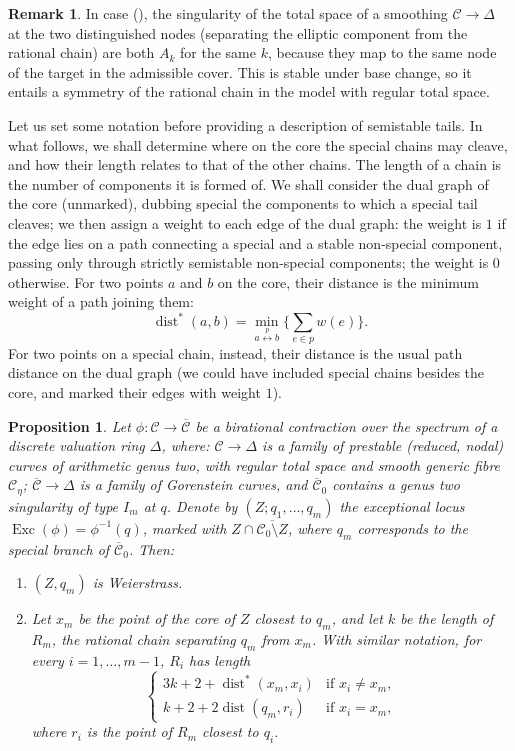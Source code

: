 \documentclass[11pt]{amsart}
\renewcommand{\to}{\rightarrow}
\newcommand{\dvr}{\Delta}
\newcommand{\dist}{\operatorname{dist}}
\newcommand{\Exc}{\operatorname{Exc}}
\theoremstyle{plain}
\newtheorem{prop}[thm]{Proposition}
\theoremstyle{definition}
\newtheorem{rem}[thm]{Remark}
\begin{document}
 \begin{rem}\label{rmk:necklace_symmetry}
  In case (\dag), the singularity of the total space of a smoothing $\mathcal C\to\dvr$ at the two distinguished nodes (separating the elliptic component from the rational chain) are both $A_k$ for the same $k$, because they map to the same node of the target in the admissible cover. This is stable under base change, so it entails a symmetry of the rational chain in the model with regular total space.
 \end{rem}

 Let us set some notation before providing a description of semistable tails. In what follows, we shall determine where on the core the special chains may cleave, and how their length relates to that of the other chains. The length of a chain is the number of components it is formed of. We shall consider the dual graph of the core (unmarked), dubbing special the components to which a special tail cleaves; we then assign a weight to each edge of the dual graph: the weight is $1$ if the edge lies on a path connecting a special and a stable non-special component, passing only through strictly semistable non-special components; the weight is $0$ otherwise. For two points $a$ and $b$ on the core, their distance is the minimum weight of a path joining them:\[\dist^*(a,b)=\min_{a\overset{p}\leftrightarrow b}\{\sum_{e\in p}w(e)\}.\]
 For two points on a special chain, instead, their distance is the usual path distance on the dual graph (we could have included special chains besides the core, and marked their edges with weight $1$).

\begin{prop}\label{prop:tailI}
 Let $\phi\colon\mathcal C\to\overline{\mathcal C}$ be a birational contraction over the spectrum of a discrete valuation ring $\dvr$, where: $\mathcal C\to \dvr$ is a family of prestable (reduced, nodal) curves of arithmetic genus two, with regular total space and smooth generic fibre $\mathcal C_{\eta}$; $\overline{\mathcal C}\to\dvr$ is a family of Gorenstein curves, and $\overline{\mathcal C}_0$ contains a genus two singularity of type $I_m$ at $q$. Denote by $(Z;q_1,\ldots,q_m)$ the exceptional locus $\Exc(\phi)=\phi^{-1}(q)$, marked with $Z\cap\overline{\mathcal C_0\setminus Z}$, where $q_m$ corresponds to the special branch of $\overline{\mathcal C}_0$. Then:
 \begin{enumerate}[leftmargin=.6cm]
  \item $(Z,q_m)$ is Weierstrass.
  \item Let $x_m$ be the point of the core of $Z$ closest to $q_m$, and let $k$ be the length of $R_m$, the rational chain separating $q_m$ from $x_m$. With similar notation, for every $i=1,\ldots,m-1$, $R_i$ has length 
  \begin{equation*}
  \begin{cases}
   3k+2+\dist^*(x_m,x_i) & \text{if } x_i\neq x_m,\\
   k+2+2\dist(q_m,r_i)  & \text{if } x_i=x_m,
  \end{cases} 
  \end{equation*}
 where $r_i$ is the point of $R_m$ closest to $q_i$.
 \end{enumerate}
\end{prop}
\end{document}
